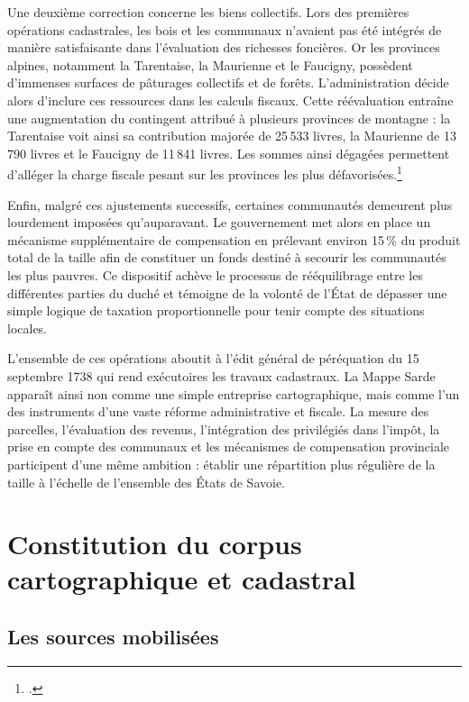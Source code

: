 \documentclass[12pt,a4paper]{report}
\begin{document}
Une deuxième correction concerne les biens collectifs. Lors des premières opérations cadastrales, les bois et les communaux n'avaient pas été intégrés de manière satisfaisante dans l'évaluation des richesses foncières. Or les provinces alpines, notamment la Tarentaise, la Maurienne et le Faucigny, possèdent d'immenses surfaces de pâturages collectifs et de forêts. L'administration décide alors d'inclure ces ressources dans les calculs fiscaux. Cette réévaluation entraîne une augmentation du contingent attribué à plusieurs provinces de montagne : la Tarentaise voit ainsi sa contribution majorée de 25\,533 livres, la Maurienne de 13\,790 livres et le Faucigny de 11\,841 livres. Les sommes ainsi dégagées permettent d'alléger la charge fiscale pesant sur les provinces les plus défavorisées.\footcite{BruchetCadastre}

Enfin, malgré ces ajustements successifs, certaines communautés demeurent plus lourdement imposées qu'auparavant. Le gouvernement met alors en place un mécanisme supplémentaire de compensation en prélevant environ 15\,\% du produit total de la taille afin de constituer un fonds destiné à secourir les communautés les plus pauvres. Ce dispositif achève le processus de rééquilibrage entre les différentes parties du duché et témoigne de la volonté de l'État de dépasser une simple logique de taxation proportionnelle pour tenir compte des situations locales.

L'ensemble de ces opérations aboutit à l'édit général de péréquation du 15 septembre 1738 qui rend exécutoires les travaux cadastraux. La Mappe Sarde apparaît ainsi non comme une simple entreprise cartographique, mais comme l'un des instruments d'une vaste réforme administrative et fiscale. La mesure des parcelles, l'évaluation des revenus, l'intégration des privilégiés dans l'impôt, la prise en compte des communaux et les mécanismes de compensation provinciale participent d'une même ambition : établir une répartition plus régulière de la taille à l'échelle de l'ensemble des États de Savoie.
	
\chapter{Constitution du corpus cartographique et cadastral}


\section{Les sources mobilisées}
\end{document}
